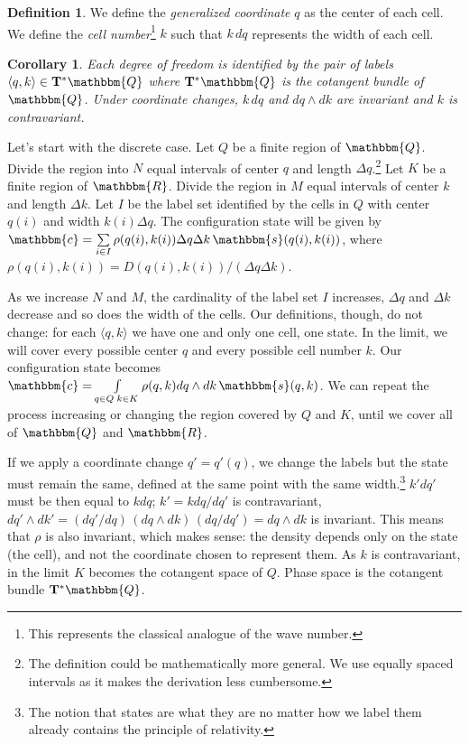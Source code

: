 \documentclass[aps,pra,10pt,twocolumn,floatfix,nofootinbib]{revtex4-1}
\newtheorem{cor}[thm]{Corollary}
\theoremstyle{definition}
\newtheorem{defn}[thm]{Definition}
\begin{document}
\begin{defn}\label{generalizedCoordinates}
We define the \emph{generalized coordinate} $q$ as the center of each cell. We define the \emph{cell number}\footnote{This represents the classical analogue of the wave number.} $k$ such that $k \, dq$ represents the width of each cell.
\end{defn}

\begin{cor}\label{continuousLabels}
Each degree of freedom is identified by the pair of labels $\langle q,k \rangle \in \mathbf{T}^*\mathbbm{Q}$ where $\mathbf{T}^*\mathbbm{Q}$ is the cotangent bundle of $\mathbbm{Q}$. Under coordinate changes, $k\,dq$ and $dq\wedge dk$ are invariant and $k$ is contravariant.
\end{cor}

Let's start with the discrete case. Let $Q$ be a finite region of $\mathbbm{Q}$. Divide the region into $N$ equal intervals of center $q$ and length $\Delta q$.\footnote{The definition could be mathematically more general. We use equally spaced intervals as it makes the derivation less cumbersome.} Let $K$ be a finite region of $\mathbbm{R}$. Divide the region in $M$ equal intervals of center $k$ and length $\Delta k$. Let $I$ be the label set identified by the cells in $Q$ with center $q(i)$ and width $k(i) \Delta q$. The configuration state will be given by $\mathbbm{c}=\sum\limits_{i \in I} \rho(q(i), k(i)) \Delta q \Delta k \, \mathbbm{s}(q(i), k(i))$, where $\rho(q(i), k(i)) = D(q(i), k(i)) / (\Delta q \Delta k)$.

As we increase $N$ and $M$, the cardinality of the label set $I$ increases, $\Delta q$ and $\Delta k$ decrease and so does the width of the cells. Our definitions, though, do not change: for each $\langle q,k \rangle$ we have one and only one cell, one state. In the limit, we will cover every possible center $q$ and every possible cell number $k$. Our configuration state becomes $\mathbbm{c}=\int\limits_{q \in Q \; k\in K} \rho(q, k) dq \wedge dk \, \mathbbm{s}(q, k)$. We can repeat the process increasing or changing the region covered by $Q$ and $K$, until we cover all of $\mathbbm{Q}$ and $\mathbbm{R}$.

If we apply a coordinate change $q'=q'(q)$, we change the labels but the state must remain the same, defined at the same point with the same width.\footnote{The notion that states are what they are no matter how we label them already contains the principle of relativity.} $k' dq'$ must be then equal to $k dq$; $k'= k dq / dq'$ is contravariant, $dq' \wedge dk'= (dq'/dq) \, (dq \wedge dk) \, (dq/dq') = dq \wedge dk$ is invariant. This means that $\rho$ is also invariant, which makes sense: the density depends only on the state (the cell), and not the coordinate chosen to represent them. As $k$ is contravariant, in the limit $K$ becomes the cotangent space of $Q$. Phase space is the cotangent bundle $\mathbf{T}^*\mathbbm{Q}$.
\end{document}
